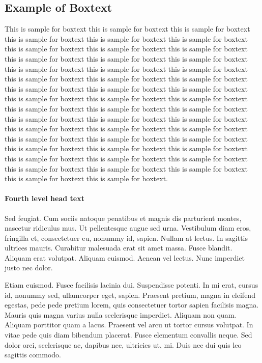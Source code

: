 \documentclass[CJCE,STIX2COL]{WileyNJD-v2}
\begin{document}
\begin{boxtext}
\section*{Example of Boxtext}%
This is sample for boxtext this is sample for boxtext this is sample for boxtext this is sample for boxtext this is sample for boxtext this is sample for boxtext this is sample for boxtext this is sample for boxtext this is sample for boxtext this is sample for boxtext this is sample for boxtext this is sample for boxtext this is sample for boxtext this is sample for boxtext this is sample for boxtext this is sample for boxtext this is sample for boxtext this is sample for boxtext this is sample for boxtext this is sample for boxtext this is sample for boxtext this is sample for boxtext this is sample for boxtext this is sample for boxtext this is sample for boxtext this is sample for boxtext this is sample for boxtext this is sample for boxtext this is sample for boxtext this is sample for boxtext this is sample for boxtext this is sample for boxtext this is sample for boxtext this is sample for boxtext this is sample for boxtext this is sample for boxtext this is sample for boxtext this is sample for boxtext this is sample for boxtext this is sample for boxtext this is sample for boxtext this is sample for boxtext this is sample for boxtext this is sample for boxtext this is sample for boxtext this is sample for boxtext this is sample for boxtext.
\end{boxtext}

\paragraph{Fourth level head text}

Sed feugiat. Cum sociis natoque penatibus et magnis dis parturient montes, nascetur ridiculus mus. Ut pellentesque
augue sed urna. Vestibulum diam eros, fringilla et, consectetuer eu, nonummy id, sapien. Nullam at lectus. In sagittis
ultrices mauris. Curabitur malesuada erat sit amet massa. Fusce blandit. Aliquam erat volutpat. Aliquam euismod.
Aenean vel lectus. Nunc imperdiet justo nec dolor.

Etiam euismod. Fusce facilisis lacinia dui. Suspendisse potenti. In mi erat, cursus id, nonummy sed, ullamcorper
eget, sapien. Praesent pretium, magna in eleifend egestas, pede pede pretium lorem, quis consectetuer tortor sapien
facilisis magna. Mauris quis magna varius nulla scelerisque imperdiet. Aliquam non quam. Aliquam porttitor quam
a lacus. Praesent vel arcu ut tortor cursus volutpat. In vitae pede quis diam bibendum placerat. Fusce elementum
convallis neque. Sed dolor orci, scelerisque ac, dapibus nec, ultricies ut, mi. Duis nec dui quis leo sagittis commodo.
\end{document}
